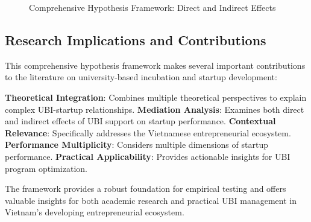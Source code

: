 \documentclass[../Main.tex]{subfiles}
\begin{document}
\begin{figure}[H]
        \caption{Comprehensive Hypothesis Framework: Direct and Indirect Effects}
        \label{fig:comprehensive_hypothesis_framework}
    \end{figure}

    \subsection{Research Implications and Contributions}
    This comprehensive hypothesis framework makes several important contributions to the literature on university-based incubation and startup development:

    \textbf{Theoretical Integration}: Combines multiple theoretical perspectives to explain complex UBI-startup relationships. 
    \textbf{Mediation Analysis}: Examines both direct and indirect effects of UBI support on startup performance. 
    \textbf{Contextual Relevance}: Specifically addresses the Vietnamese entrepreneurial ecosystem. 
    \textbf{Performance Multiplicity}: Considers multiple dimensions of startup performance. 
    \textbf{Practical Applicability}: Provides actionable insights for UBI program optimization.

    The framework provides a robust foundation for empirical testing and offers valuable insights for both academic research and practical UBI management in Vietnam's developing entrepreneurial ecosystem.
\end{document}
